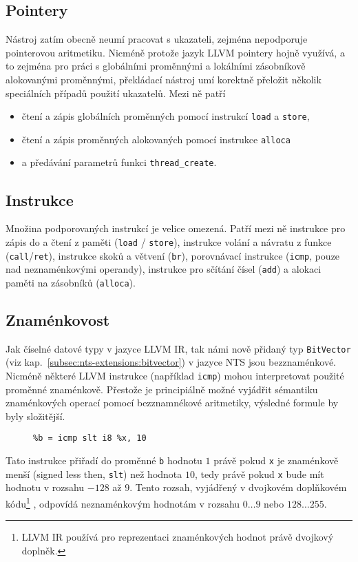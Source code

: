\documentclass[12pt]{fithesis2}
\begin{document}
\subsection{Pointery}
Nástroj zatím obecně neumí pracovat s ukazateli, zejména nepodporuje pointerovou aritmetiku. Nicméně protože jazyk LLVM pointery hojně využívá, a to zejména pro práci s globálními proměnnými a lokálními zásobníkově alokovanými proměnnými, překládací nástroj umí korektně přeložit několik speciálních případů použití ukazatelů. Mezi ně patří
\begin{itemize}
\item čtení a zápis globálních proměnných pomocí instrukcí \texttt{load} a \texttt{store},
\item čtení a zápis proměnných alokovaných pomocí instrukce \texttt{alloca}
\item a předávání parametrů funkci \texttt{thread\_create}.
\end{itemize}

\subsection{Instrukce}
Množina podporovaných instrukcí je velice omezená. Patří mezi ně instrukce pro zápis do a čtení z paměti (\texttt{load} / \texttt{store}), instrukce volání a návratu z funkce (\texttt{call}/\texttt{ret}), instrukce skoků a větvení (\texttt{br}), porovnávací instrukce (\texttt{icmp}, pouze nad neznaménkovými operandy), instrukce pro sčítání čísel (\texttt{add}) a alokaci paměti na zásobníků (\texttt{alloca}).

\subsection{Znaménkovost}
Jak číselné datové typy v jazyce LLVM IR, tak námi nově přidaný typ \texttt{BitVector} (viz kap.~\ref{subsec:nts-extensions:bitvector}) v jazyce NTS jsou bezznaménkové. Nicméně některé LLVM instrukce (například \texttt{icmp}) mohou interpretovat použité proměnné znaménkově. Přestože je principiálně možné vyjádřit sémantiku znaménkových operací pomocí bezznamnékové aritmetiky, výsledné formule by byly složitější.
\begin{figure}[h!]
\begin{lstlisting}
%b = icmp slt i8 %x, 10
\end{lstlisting}
\end{figure}
Tato instrukce přiřadí do proměnné \texttt{b} hodnotu $1$ právě pokud \texttt{x} je znaménkově menší (signed less then, \texttt{slt}) než hodnota $10$, tedy právě pokud \texttt{x} bude mít hodnotu v rozsahu $-128$ až $9$. Tento rozsah, vyjádřený v dvojkovém doplňkovém kódu\footnote{LLVM IR používá pro reprezentaci znaménkových hodnot právě dvojkový doplněk.} , odpovídá neznaménkovým hodnotám v rozsahu $0 \ldots 9$ nebo $128 \ldots 255$. 
\end{document}
